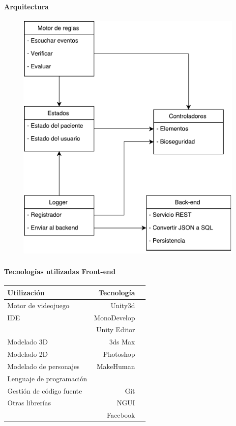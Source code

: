 \begin{frame}
\frametitle{\pagetitle}
\framesubtitle{Arquitectura}
\begin{figure}
\includegraphics[width=\textwidth,height=0.7\textheight,keepaspectratio]{./imagenes/esquema_global.pdf}
\end{figure}
\end{frame}

\begin{frame}
\frametitle{\pagetitle}
\framesubtitle{Tecnologías utilizadas \- Front-end}
\begin{table}
\centering
\begin{tabular}{lrr}
\toprule
\textbf{Utilización} & \textbf{Tecnología} \\
\midrule
Motor de videojuego      & Unity3d         \\
IDE                      & MonoDevelop     \\
                         & Unity Editor    \\
\midrule
Modelado 3D              & 3ds Max         \\
Modelado 2D              & Photoshop       \\
Modelado de personajes   & MakeHuman       \\

\midrule
Lenguaje de programación & \cs{} \\
Gestión de código fuente & Git \\
Otras librerías          & NGUI            \\
                         & Facebook \\
                         
\bottomrule
\end{tabular}
\end{table}
\end{frame}

